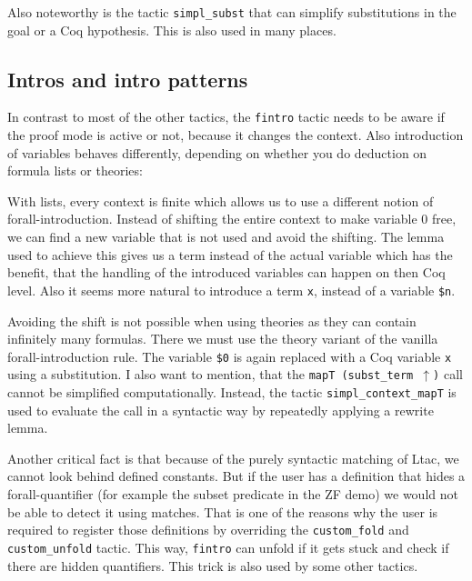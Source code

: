 \documentclass[12pt, a4paper]{article}
\begin{document}
\medskip\noindent
Also noteworthy is the tactic \texttt{simpl\_subst} that can simplify substitutions in the goal or a Coq hypothesis.
This is also used in many places.



\subsection{Intros and intro patterns}

In contrast to most of the other tactics, the \texttt{fintro} tactic needs to be aware if the proof mode is active or not, because it changes the context.
Also introduction of variables behaves differently, depending on whether you do deduction on formula lists or theories:

\medskip\noindent
With lists, every context is finite which allows us to use a different notion of forall-introduction.
Instead of shifting the entire context to make variable 0 free, we can find a new variable that is not used and avoid the shifting.
The lemma used to achieve this gives us a term instead of the actual variable which has the benefit, that the handling of the introduced variables can happen on then Coq level.
Also it seems more natural to introduce a term \texttt{x}, instead of a variable \texttt{\$n}.

Avoiding the shift is not possible when using theories as they can contain infinitely many formulas.
There we must use the theory variant of the vanilla forall-introduction rule.
The variable \texttt{\$0} is again replaced with a Coq variable \texttt{x} using a substitution.
I also want to mention, that the \texttt{mapT (subst\_term $\uparrow$)} call cannot be simplified computationally.
Instead, the tactic \texttt{simpl\_context\_mapT} is used to evaluate the call in a syntactic way by repeatedly applying a rewrite lemma.

\medskip\noindent
Another critical fact is that because of the purely syntactic matching of Ltac, we cannot look behind defined constants.
But if the user has a definition that hides a forall-quantifier (for example the subset predicate in the ZF demo) we would not be able to detect it using matches.
That is one of the reasons why the user is required to register those definitions by overriding the \texttt{custom\_fold} and \texttt{custom\_unfold} tactic.
This way, \texttt{fintro} can unfold if it gets stuck and check if there are hidden quantifiers.
This trick is also used by some other tactics.
\end{document}
